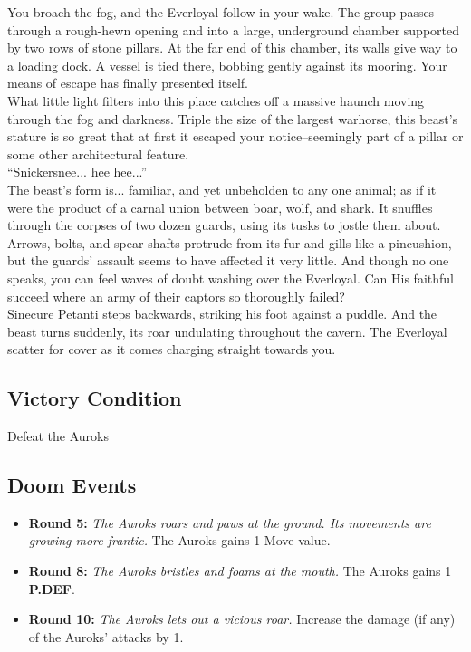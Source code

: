 You broach the fog, and the Everloyal follow in your wake. The group passes through a rough-hewn opening and into a large, underground chamber supported by two rows of stone pillars. At the far end of this chamber, its walls give way to a loading dock. A vessel is tied there, bobbing gently against its mooring. Your means of escape has finally presented itself.\\

What little light filters into this place catches off a massive haunch moving through the fog and darkness. Triple the size of the largest warhorse, this beast’s stature is so great that at first it escaped your notice--seemingly part of a pillar or some other architectural feature.\\

“Snickersnee... hee hee...”\\

The beast's form is... familiar, and yet unbeholden to any one animal; as if it were the product of a carnal union between boar, wolf, and shark. It snuffles through the corpses of two dozen guards, using its tusks to jostle them about. Arrows, bolts, and spear shafts protrude from its fur and gills like a pincushion, but the guards’ assault seems to have affected it very little. And though no one speaks, you can feel waves of doubt washing over the Everloyal. Can His faithful succeed where an army of their captors so thoroughly failed?\\

Sinecure Petanti steps backwards, striking his foot against a puddle. And the beast turns suddenly, its roar undulating throughout the cavern. The Everloyal scatter for cover as it comes charging straight towards you.

\subsection*{Victory Condition}
Defeat the Auroks

\subsection*{Doom Events}
\begin{itemize}
\item \textbf{Round 5:} \emph{The Auroks roars and paws at the ground. Its movements are growing more frantic.} The Auroks gains 1 Move value.
\item \textbf{Round 8:} \emph{The Auroks bristles and foams at the mouth.} The Auroks gains 1 \textbf{P.DEF}.
\item \textbf{Round 10:} \emph{The Auroks lets out a vicious roar.} Increase the damage (if any) of the Auroks’ attacks by 1.
\end{itemize}

